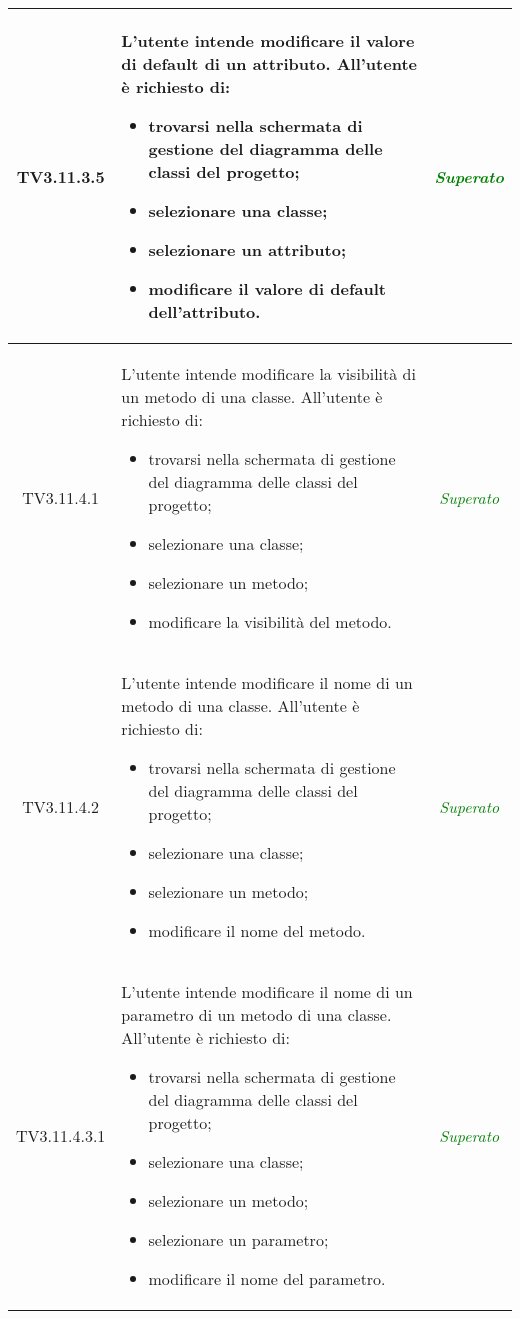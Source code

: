 \begin{longtable}{|c|>{}m{8cm}|c|}
\hypertarget{TV3.11.3.5}{TV3.11.3.5} & L'utente intende modificare il valore di default di un attributo.
All'utente è richiesto di:
\begin{itemize}
	\item trovarsi nella schermata di gestione del diagramma delle classi del progetto;
	\item selezionare una classe;
	\item selezionare un attributo;
	\item modificare il valore di default dell'attributo.
\end{itemize} & \textcolor{Green}{\textit{Superato}}\\ \hline

\hypertarget{TV3.11.4.1}{TV3.11.4.1} & L'utente intende modificare la visibilità di un metodo di una classe.
All'utente è richiesto di:
\begin{itemize}
	\item trovarsi nella schermata di gestione del diagramma delle classi del progetto;
	\item selezionare una classe;
	\item selezionare un metodo;
	\item modificare la visibilità del metodo.
\end{itemize} & \textcolor{Green}{\textit{Superato}}\\ \hline

\hypertarget{TV3.11.4.2}{TV3.11.4.2} & L'utente intende modificare il nome di un metodo di una classe.
All'utente è richiesto di:
\begin{itemize}
	\item trovarsi nella schermata di gestione del diagramma delle classi del progetto;
	\item selezionare una classe;
	\item selezionare un metodo;
	\item modificare il nome del metodo.
\end{itemize} & \textcolor{Green}{\textit{Superato}}\\ \hline

\hypertarget{TV3.11.4.3.1}{TV3.11.4.3.1} & L'utente intende modificare il nome di un parametro di un metodo di una classe.
All'utente è richiesto di:
\begin{itemize}
	\item trovarsi nella schermata di gestione del diagramma delle classi del progetto;
	\item selezionare una classe; 
	\item selezionare un metodo; 
	\item selezionare un parametro;
	\item modificare il nome del parametro.
\end{itemize} & \textcolor{Green}{\textit{Superato}}\\ \hline


\end{longtable}
